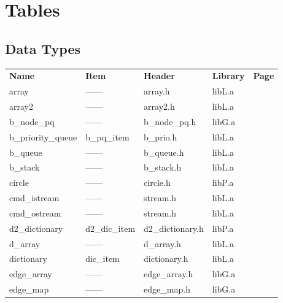 \chapter{Tables} \label{Tables}

\section{Data Types} \label{Table Data Types}

\begin{tabular}{lllll}
{\bf Name}         &{\bf Item}      &{\bf Header}      &{\bf Library}  &{\bf Page}\\
array              &------          &array.h           &libL.a         &\pageref{One Dimensional Arrays}\\
array2             &------          &array2.h          &libL.a         &\pageref{Two Dimensional Arrays}\\
b\_node\_pq        &------          &b\_node\_pq.h     &libG.a         &\pageref{Bounded Node Priority Queues}\\
b\_priority\_queue &b\_pq\_item     &b\_prio.h         &libL.a         &\pageref{Bounded Priority Queues}\\
b\_queue           &------          &b\_queue.h        &libL.a         &\pageref{Bounded Queues}\\
b\_stack           &------          &b\_stack.h        &libL.a         &\pageref{Bounded Stacks}\\
circle             &------          &circle.h           &libP.a         &\pageref{Circles}\\
cmd\_istream       &------          &stream.h          &libL.a         &\pageref{Command Input Streams}\\
cmd\_ostream       &------          &stream.h          &libL.a         &\pageref{Command Output Streams}\\
d2\_dictionary      &d2\_dic\_item   &d2\_dictionary.h  &libP.a         &\pageref{Two-Dimensional Dictionaries}\\
d\_array            &------          &d\_array.h        &libL.a         &\pageref{Dictionary Arrays}\\
dictionary          &dic\_item       &dictionary.h      &libL.a         &\pageref{Dictionaries}\\
edge\_array         &------          &edge\_array.h     &libG.a         &\pageref{Edge Arrays}\\
edge\_map           &------          &edge\_map.h        &libG.a         &\pageref{Edge Maps}\\

\end{tabular}
